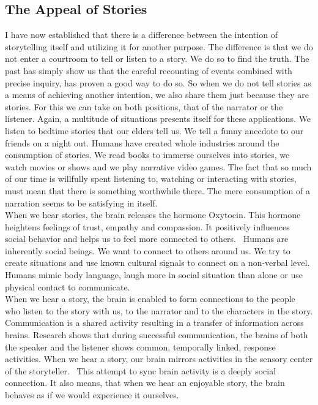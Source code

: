 \subsection{The Appeal of Stories}
I have now established that there is a difference between the intention of storytelling itself and utilizing it for another purpose. The difference is that we do not enter a courtroom to tell or listen to a story. We do so to find the truth. The past has simply show us that the careful recounting of events combined with precise inquiry, has proven a good way to do so. So when we do not tell stories as a means of achieving another intention, we also share them just because they are stories. For this we can take on both positions, that of the narrator or the listener. Again, a multitude of situations presents itself for these applications. We listen to bedtime stories that our elders tell us. We tell a funny anecdote to our friends on a night out. Humans have created whole industries around the consumption of stories. We read books to immerse ourselves into stories, we watch movies or shows and we play narrative video games. The fact that so much of our time is willfully spent listening to, watching or interacting with stories, must mean that there is something worthwhile there. The mere consumption of a narration seems to be satisfying in itself.\\
When we hear stories, the brain releases the hormone Oxytocin. This hormone heightens feelings of trust, empathy and compassion. It positively influences social behavior and helps us to feel more connected to others.~\cite{Gottschall2012} Humans are inherently social beings. We want to connect to others around us. We try to create situations and use known cultural signals to connect on a non-verbal level. Humans mimic body language, laugh more in social situation than alone or use physical contact to communicate.~\cite{Frith2007}\\
When we hear a story, the brain is enabled to form connections to the people who listen to the story with us, to the narrator and to the characters in the story. Communication is a shared activity resulting in a transfer of information across brains. Research shows that during successful communication, the brains of both the speaker and the listener shows common, temporally linked, response activities. When we hear a story, our brain mirrors activities in the sensory center of the storyteller.~\cite{Stephens2010} This attempt to sync brain activity is a deeply social connection. It also means, that when we hear an enjoyable story, the brain behaves as if we would experience it ourselves.

